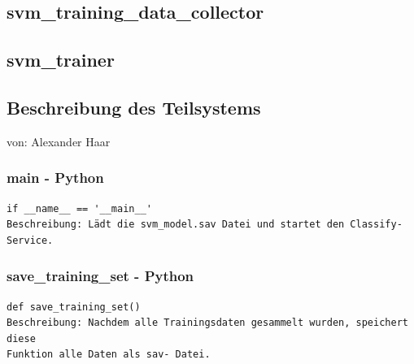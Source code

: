 \documentclass{suturo}
\makeatletter
\newcommand{\chapterauthor}[1]{%
  {\parindent0pt\vspace*{-27pt}%
  \linespread{0}\small\begin{flushright}von: #1\end{flushright}%
  \par\nobreak\vspace*{0pt}}
  \@afterheading%
}
\makeatother
\begin{document}
\subsection{svm\_training\_data\_collector}
\begin{figure}[!htb]
\end{figure}

\subsection{svm\_trainer}
\begin{figure}[!htb]
\end{figure}
      
\subsection{Beschreibung des Teilsystems}
\chapterauthor{Alexander Haar}

\subsubsection{main - Python}
\begin{verbatim}
if __name__ == '__main__'
Beschreibung: Lädt die svm_model.sav Datei und startet den Classify- Service.
\end{verbatim}

\subsubsection{save\_training\_set - Python}
\begin{verbatim}
def save_training_set()
Beschreibung: Nachdem alle Trainingsdaten gesammelt wurden, speichert diese 
Funktion alle Daten als sav- Datei.
\end{verbatim}
\end{document}
